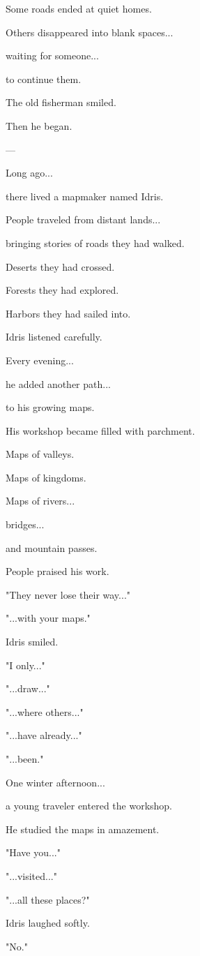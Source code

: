 \documentclass[12pt,openany]{book}
\begin{document}
Some roads ended at quiet homes.

Others disappeared into blank spaces...

waiting for someone...

to continue them.

The old fisherman smiled.

Then he began.

---

Long ago...

there lived a mapmaker named Idris.

People traveled from distant lands...

bringing stories of roads they had walked.

Deserts they had crossed.

Forests they had explored.

Harbors they had sailed into.

Idris listened carefully.

Every evening...

he added another path...

to his growing maps.

His workshop became filled with parchment.

Maps of valleys.

Maps of kingdoms.

Maps of rivers...

bridges...

and mountain passes.

People praised his work.

"They never lose their way..."

"...with your maps."

Idris smiled.

"I only..."

"...draw..."

"...where others..."

"...have already..."

"...been."

One winter afternoon...

a young traveler entered the workshop.

He studied the maps in amazement.

"Have you..."

"...visited..."

"...all these places?"

Idris laughed softly.

"No."
\end{document}

